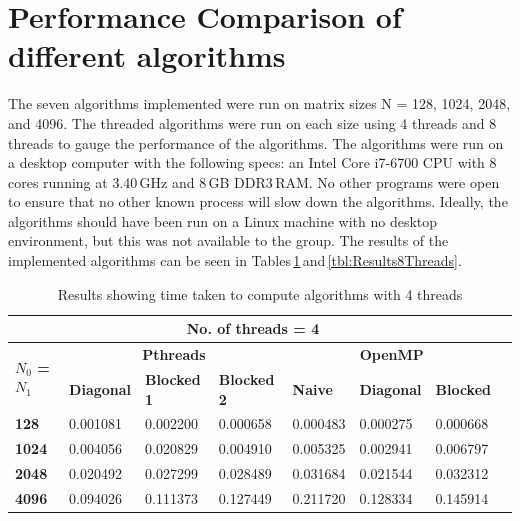 \documentclass[10pt, onecolumn]{article}
\begin{document}
\section{Performance Comparison of different algorithms}
The seven algorithms implemented were run on matrix sizes N = 128, 1024, 2048, and 4096. The threaded algorithms were run on each size using 4 threads and 8 threads to gauge the performance of the algorithms. The algorithms were run on a desktop computer with the following specs: an Intel Core i7-6700 CPU with 8\,cores running at 3.40\,GHz and 8\,GB DDR3\,RAM. No other programs were open to ensure that no other known process will slow down the algorithms. Ideally, the algorithms should have been run on a Linux machine with no desktop environment, but this was not available to the group. The results of the implemented algorithms can be seen in Tables\,\ref{tbl:Results4Threads}\,and\,\ref{tbl:Results8Threads}.
%
\begin{table}[H]
    \vspace{-0.5cm}
    \centering
    \caption{Results showing time taken to compute algorithms with 4 threads}
    \label{tbl:Results4Threads}
    \begin{tabular}{|l|l|l|l|l|l|l|l|}
    \hline
    \multicolumn{7}{|c|}{\textbf{No. of threads = 4}} \\ \hline
    \multirow{2}{*}{\textbf{$N_0$ = $N_1$}} & \multicolumn{3}{c|}{\textbf{Pthreads}} & \multicolumn{3}{c|}{\textbf{OpenMP}} \\ \cline{2-7} 
    & \textbf{Diagonal} & \textbf{Blocked 1} & \textbf{Blocked 2} & \textbf{Naive} & \textbf{Diagonal} & \textbf{Blocked} \\ \hline
    \textbf{128}  &0.001081  &0.002200  &0.000658  &0.000483  &0.000275  &0.000668  \\ \hline
    \textbf{1024} &0.004056  &0.020829  &0.004910  &0.005325  &0.002941  &0.006797  \\ \hline
    \textbf{2048} &0.020492  &0.027299  &0.028489  &0.031684  &0.021544  &0.032312  \\ \hline
    \textbf{4096} &0.094026  &0.111373  &0.127449  &0.211720  &0.128334  &0.145914  \\ \hline
    \end{tabular}
\end{table}
%
\end{document}
